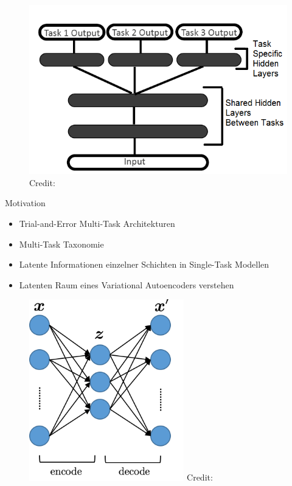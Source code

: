 \begin{frame}
	\begin{figure}
		\includegraphics[width=\textwidth]{images/figures/presentation/multi-task-models.png}
		\vspace*{15pt}\hbox{\scriptsize Credit:}
	\end{figure}
\end{frame}

\begin{frame}{Motivation}
	\begin{itemize}
		\item Trial-and-Error Multi-Task Architekturen
		\item Multi-Task Taxonomie
		\item Latente Informationen einzelner Schichten in Single-Task Modellen
		\item Latenten Raum eines Variational Autoencoders verstehen
	\end{itemize}
\end{frame}

\begin{frame}
	\begin{figure}
		\includegraphics[width=0.6\textwidth]{images/figures/presentation/autoencoder.png}
		\vspace*{15pt}\hbox{\scriptsize Credit:}
	\end{figure}
\end{frame}

